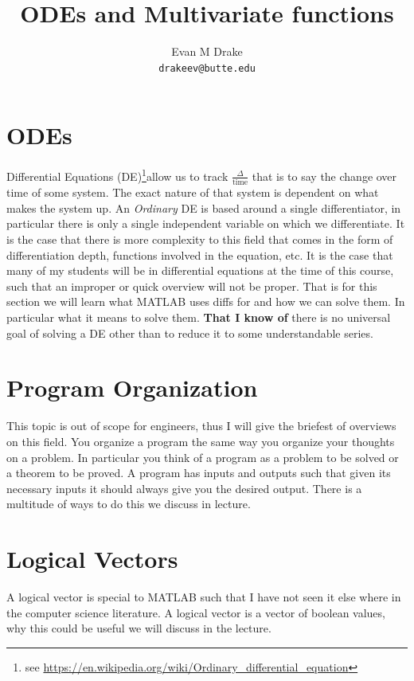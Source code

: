 \documentclass[12pt]{article}
\title{ODEs and Multivariate functions}
\author{
	Evan M Drake \\
	\texttt{drakeev@butte.edu}
}
\begin{document}
	\maketitle
	\tableofcontents

	\newpage


	\section{ODEs}
		Differential Equations (DE)\footnote{
			see \url{https://en.wikipedia.org/wiki/Ordinary_differential_equation}
			}allow us to track $\frac{\Delta}{\text{time}}$ that is to say the change over time of some system.
		The exact nature of that system is dependent on what makes the system up.
		An \textit{Ordinary} DE is based around a single differentiator,
			in particular there is only a single independent variable on which we differentiate.
		It is the case that there is more complexity to this field that comes in the form of differentiation depth,
			functions involved in the equation,
			etc.
		It is the case that many of my students will be in differential equations at the time of this course,
			such that an improper or quick overview will not be proper.
		That is for this section we will learn what MATLAB uses diffs for and how we can solve them.
		In particular what it means to solve them.
		\textbf{That I know of} there is no universal goal of solving a DE other than to reduce it to some understandable series.

	\section{Program Organization}
		This topic is out of scope for engineers,
			thus I will give the briefest of overviews on this field.
		You organize a program the same way you organize your thoughts on a problem.
		In particular you think of a program as a problem to be solved or a theorem to be proved.
		A program has inputs and outputs such that given its necessary inputs it should always give you the desired output.
		There is a multitude of ways to do this we discuss in lecture.

	\section{Logical Vectors}
		A logical vector is special to MATLAB such that I have not seen it else where in the computer science literature.
		A logical vector is a vector of boolean values,
			why this could be useful we will discuss in the lecture.


	\nocite{*}

	\newpage %
	\backmatter
	\printbibliography

	\newpage %
	\printindex

	\newpage %
	\appendix
\end{document}
